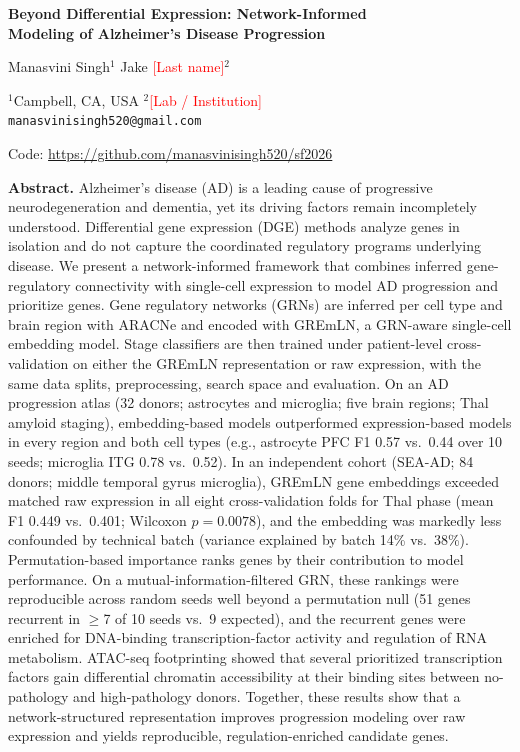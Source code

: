 \documentclass[10pt,twocolumn,letterpaper]{article}
\newcommand{\todo}[1]{\textcolor{red}{[#1]}}
\begin{document}
\onecolumn
\thispagestyle{empty}
\begin{center}
{\LARGE\bfseries Beyond Differential Expression: Network-Informed\\[2pt] Modeling of Alzheimer's Disease Progression\par}
\vspace{14pt}
{\large Manasvini Singh$^{1}$ \quad Jake \todo{Last name}$^{2}$\par}
\vspace{6pt}
{\small $^{1}$Campbell, CA, USA \quad $^{2}$\todo{Lab / Institution}\\
\texttt{manasvinisingh520@gmail.com}\par}
\vspace{6pt}
{\small Code: \url{https://github.com/manasvinisingh520/sf2026}\par}
\end{center}
\vspace{10pt}
\noindent\textbf{Abstract.}
Alzheimer's disease (AD) is a leading cause of progressive neurodegeneration and dementia, yet its driving factors remain incompletely understood. Differential gene expression (DGE) methods analyze genes in isolation and do not capture the coordinated regulatory programs underlying disease. We present a network-informed framework that combines inferred gene-regulatory connectivity with single-cell expression to model AD progression and prioritize genes. Gene regulatory networks (GRNs) are inferred per cell type and brain region with ARACNe and encoded with GREmLN, a GRN-aware single-cell embedding model. Stage classifiers are then trained under patient-level cross-validation on either the GREmLN representation or raw expression, with the same data splits, preprocessing, search space and evaluation. On an AD progression atlas (32 donors; astrocytes and microglia; five brain regions; Thal amyloid staging), embedding-based models outperformed expression-based models in every region and both cell types (e.g., astrocyte PFC F1 0.57 vs.\ 0.44 over 10 seeds; microglia ITG 0.78 vs.\ 0.52). In an independent cohort (SEA-AD; 84 donors; middle temporal gyrus microglia), GREmLN gene embeddings exceeded matched raw expression in all eight cross-validation folds for Thal phase (mean F1 0.449 vs.\ 0.401; Wilcoxon $p=0.0078$), and the embedding was markedly less confounded by technical batch (variance explained by batch 14\% vs.\ 38\%). Permutation-based importance ranks genes by their contribution to model performance. On a mutual-information-filtered GRN, these rankings were reproducible across random seeds well beyond a permutation null (51 genes recurrent in $\geq$7 of 10 seeds vs.\ 9 expected), and the recurrent genes were enriched for DNA-binding transcription-factor activity and regulation of RNA metabolism. ATAC-seq footprinting showed that several prioritized transcription factors gain differential chromatin accessibility at their binding sites between no-pathology and high-pathology donors. Together, these results show that a network-structured representation improves progression modeling over raw expression and yields reproducible, regulation-enriched candidate genes.
\end{document}
